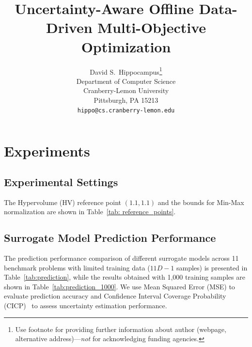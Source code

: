\documentclass{article}
\title{Uncertainty-Aware Offline Data-Driven Multi-Objective Optimization}
\author{%
  David S.~Hippocampus\thanks{Use footnote for providing further information
    about author (webpage, alternative address)---\emph{not} for acknowledging
    funding agencies.} \\
  Department of Computer Science\\
  Cranberry-Lemon University\\
  Pittsburgh, PA 15213 \\
  \texttt{hippo@cs.cranberry-lemon.edu} \\
}
\begin{document}
\maketitle

\section{Experiments}
\subsection{Experimental Settings}
The Hypervolume (HV) \cite{hypervolume} reference point $(1.1, 1.1)$ and the bounds \cite{benchmark} for Min-Max normalization \cite{indicator} are shown in Table~\ref{tab: reference_points}. 

\begin{table}[!h]
\caption{Bounds for Min-Max normalization and hypervolume reference points.}
\label{tab: reference_points}
\centering
{}

\end{table}

\subsection{Surrogate Model Prediction Performance}
The prediction performance comparison of different surrogate models across 11 benchmark problems with limited training data ($11D-1$ samples) is presented in Table~\ref{tab:prediction}, while the results obtained with 1,000 training samples are shown in Table~\ref{tab:prediction_1000}. We use Mean Squared Error (MSE) to evaluate prediction accuracy and Confidence Interval Coverage Probability (CICP)~\cite{cicp} to assess uncertainty estimation performance.
\end{document}
